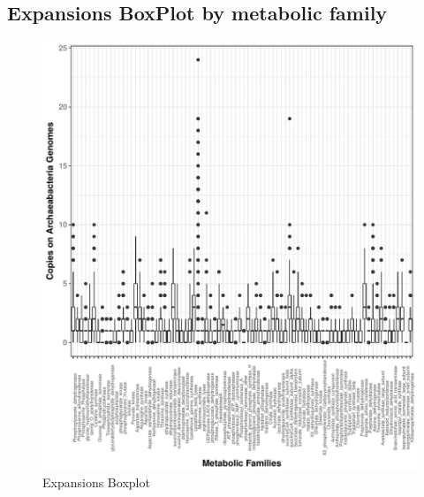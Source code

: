 \documentclass[12pt,twoside]{reedthesis}
\begin{document}
  \subsection{Expansions BoxPlot by metabolic
  family}\label{expansions-boxplot-by-metabolic-family}
  
  \begin{Shaded}
  \begin{Highlighting}[]
  \NormalTok{(} \NormalTok{, } \NormalTok{,} \NormalTok{, } \NormalTok{,}\NormalTok{)}
  \end{Highlighting}
  \end{Shaded}
  
  \begin{figure}[h!tbp]
  \centering
  \includegraphics[angle = 0,scale = .7]{chapter3/expansion_plotArchaeas.pdf}
  \caption[Expansions Boxplot]{\normalsize{Expansions Boxplot}}
  \label{fig:Archaea_expansion_boxplot}
  \end{figure}
  
\end{document}
